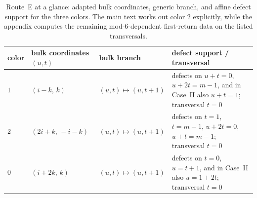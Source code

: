 \documentclass[11pt]{article}
\begin{document}
\begin{table}[t]
\centering
\footnotesize
\setlength{\tabcolsep}{4pt}
\begin{tabularx}{\textwidth}{@{}l l l >{\raggedright\arraybackslash}X@{}}
\toprule
color & bulk coordinates $(u,t)$ & bulk branch & defect support / transversal \\
\midrule
$1$ & $(i-k,\,k)$ & $(u,t)\mapsto(u,t+1)$ & defects on $u+t=0$, $u+2t=m-1$, and in Case~II also $u+t=1$; transversal $t=0$ \\
$2$ & $(2i+k,\,-i-k)$ & $(u,t)\mapsto(u,t+1)$ & defects on $t=1$, $t=m-1$, $u+2t=0$, $u+t=m-1$; transversal $t=0$ \\
$0$ & $(i+2k,\,k)$ & $(u,t)\mapsto(u,t+1)$ & defects on $t=0$, $u=t+1$, and in Case~II also $u=1+2t$; transversal $t=0$ \\
\bottomrule
\end{tabularx}
\caption{Route~E at a glance: adapted bulk coordinates, generic branch, and affine defect support for the three colors. The main text works out color $2$ explicitly, while the appendix computes the remaining mod-$6$-dependent first-return data on the listed transversals.}
\label{tab:routeE-summary}
\end{table}
\end{document}
